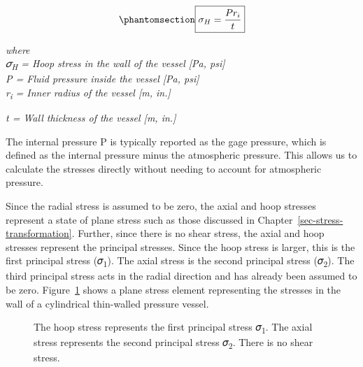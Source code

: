 \documentclass[
  letterpaper,
  DIV=11,
  numbers=noendperiod]{scrreprt}
\theoremstyle{definition}
\theoremstyle{remark}
\begin{document}
\begin{equation}\phantomsection\label{eq-13.2}{
\boxed{\sigma_H=\frac{P r_i}{t}}
}\end{equation}

\emph{where}\\
\emph{𝜎\textsubscript{H} = Hoop stress in the wall of the vessel {[}Pa,
psi{]}}\\
\emph{P = Fluid pressure inside the vessel {[}Pa, psi{]}}\\
\emph{r\textsubscript{i} = Inner radius of the vessel {[}m, in.{]}}

\emph{t = Wall thickness of the vessel {[}m, in.{]}}

The internal pressure P is typically reported as the gage pressure,
which is defined as the internal pressure minus the atmospheric
pressure. This allows us to calculate the stresses directly without
needing to account for atmospheric pressure.

Since the radial stress is assumed to be zero, the axial and hoop
stresses represent a state of plane stress such as those discussed in
Chapter~\ref{sec-stress-transformation}. Further, since there is no
shear stress, the axial and hoop stresses represent the principal
stresses. Since the hoop stress is larger, this is the first principal
stress (𝜎\textsubscript{1}). The axial stress is the second principal
stress (𝜎\textsubscript{2}). The third principal stress acts in the
radial direction and has already been assumed to be zero.
Figure~\ref{fig-13.5} shows a plane stress element representing the
stresses in the wall of a cylindrical thin-walled pressure vessel.

\begin{figure}


\caption{\label{fig-13.5}The hoop stress represents the first principal
stress 𝜎\textsubscript{1}. The axial stress represents the second
principal stress 𝜎\textsubscript{2}. There is no shear stress.}

\end{figure}%
\end{document}
